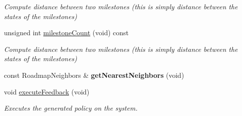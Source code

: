 \begin{DoxyCompactItemize}
\begin{DoxyCompactList}\small\item\em \-Compute distance between two milestones (this is simply distance between the states of the milestones) \end{DoxyCompactList}\item 
\hypertarget{class_f_i_r_m_a558fbb0135ab096d3cd06e65b88533de}{unsigned int \hyperlink{class_f_i_r_m_a558fbb0135ab096d3cd06e65b88533de}{milestone\-Count} (void) const }\label{class_f_i_r_m_a558fbb0135ab096d3cd06e65b88533de}

\begin{DoxyCompactList}\small\item\em \-Compute distance between two milestones (this is simply distance between the states of the milestones) \end{DoxyCompactList}\item 
\hypertarget{class_f_i_r_m_ad6df82888d88ab8479f92f9f3e453c2e}{const \-Roadmap\-Neighbors \& {\bfseries get\-Nearest\-Neighbors} (void)}\label{class_f_i_r_m_ad6df82888d88ab8479f92f9f3e453c2e}

\item 
\hypertarget{class_f_i_r_m_ae448791d4c9af9016bc9d5e9de166f0e}{void \hyperlink{class_f_i_r_m_ae448791d4c9af9016bc9d5e9de166f0e}{execute\-Feedback} (void)}\label{class_f_i_r_m_ae448791d4c9af9016bc9d5e9de166f0e}

\begin{DoxyCompactList}\small\item\em \-Executes the generated policy on the system. \end{DoxyCompactList}\end{DoxyCompactItemize}
